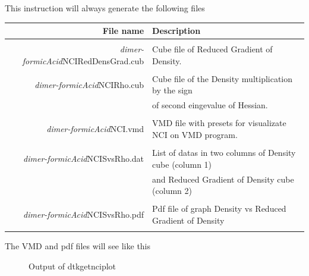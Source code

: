 This instruction will always generate the following files \\
\begin{tabular}{r ||l}
\hline 
\textbf{File name}  & \textbf{Description}   \\ \hline
 & \\
{\it dimer-formicAcid}NCIRedDensGrad.cub& Cube file of Reduced Gradient of Density. \\
 & \\
{\it dimer-formicAcid}NCIRho.cub& Cube file of the Density multiplication by the sign \\ 
                                 & of second eingevalue of Hessian. \\
 & \\
{\it dimer-formicAcid}NCI.vmd& VMD file with presets for visualizate NCI on VMD program. \\
 & \\
{\it dimer-formicAcid}NCISvsRho.dat& List of datas in two columns of Density cube (column 1)\\
                                    & and Reduced Gradient of Density cube (column 2) \\
 & \\
{\it dimer-formicAcid}NCISvsRho.pdf& Pdf file of graph Density vs  Reduced Gradient of Density \\ 
 & \\\hline
\end{tabular}

\vspace{5mm}

The VMD and pdf files will see like this 
%
\begin{figure}[hb!]
\centering
{}\quad
{}
\caption{Output of dtkgetnciplot}\label{fig:dtkgetnciplot}
\end{figure}
%

